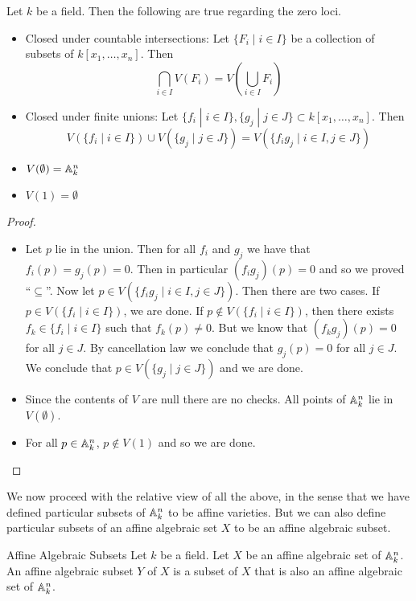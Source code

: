 \documentclass[a4paper]{article}
\begin{document}
\begin{prp}{}{} Let $k$ be a field. Then the following are true regarding the zero loci. 
\begin{itemize}
\item Closed under countable intersections: Let $\{F_i\;|\;i\in I\}$ be a collection of subsets of $k[x_1,\dots,x_n]$. Then $$\bigcap_{i\in I}V(F_i)=V\left(\bigcup_{i\in I}F_i\right)$$
\item Closed under finite unions: Let $\{f_i\;|\;i\in I\},\{g_j\;|\;j\in J\}\subset k[x_1,\dots,x_n]$. Then $$V(\{f_i\;|\;i\in I\})\cup V(\{g_j\;|\;j\in J\})=V(\{f_ig_j\;|\;i\in I, j\in J\})$$
\item $V(\emptyset)=\mathbb{A}_k^n$
\item $V(1)=\emptyset$
\end{itemize}\tcbline
\begin{proof}~\\
\begin{itemize}
\item Let $p$ lie in the union. Then for all $f_i$ and $g_j$ we have that $f_i(p)=g_j(p)=0$. Then in particular $(f_ig_j)(p)=0$ and so we proved ``$\subseteq$''. Now let $p\in V(\{f_ig_j\;|\;i\in I, j\in J\})$. Then there are two cases. If $p\in V(\{f_i\;|\;i\in I\})$, we are done. If $p\notin V(\{f_i\;|\;i\in I\})$, then there exists $f_k\in\{f_i\;|\;i\in I\}$ such that $f_k(p)\neq 0$. But we know that $(f_kg_j)(p)=0$ for all $j\in J$. By cancellation law we conclude that $g_j(p)=0$ for all $j\in J$. We conclude that $p\in V(\{g_j\;|\;j\in J\})$ and we are done. 
\item Since the contents of $V$ are null there are no checks. All points of $\mathbb{A}_k^n$ lie in $V(\emptyset)$. 
\item For all $p\in\mathbb{A}_k^n$, $p\notin V(1)$ and so we are done. 
\end{itemize}
\end{proof}
\end{prp}

We now proceed with the relative view of all the above, in the sense that we have defined particular subsets of $\mathbb{A}_k^n$ to be affine varieties. But we can also define particular subsets of an affine algebraic set $X$ to be an affine algebraic subset. 

\begin{defn}{Affine Algebraic Subsets}{} Let $k$ be a field. Let $X$ be an affine algebraic set of $\mathbb{A}_k^n$. An affine algebraic subset $Y$ of $X$ is a subset of $X$ that is also an affine algebraic set of $\mathbb{A}_k^n$. 
\end{defn}
\end{document}

